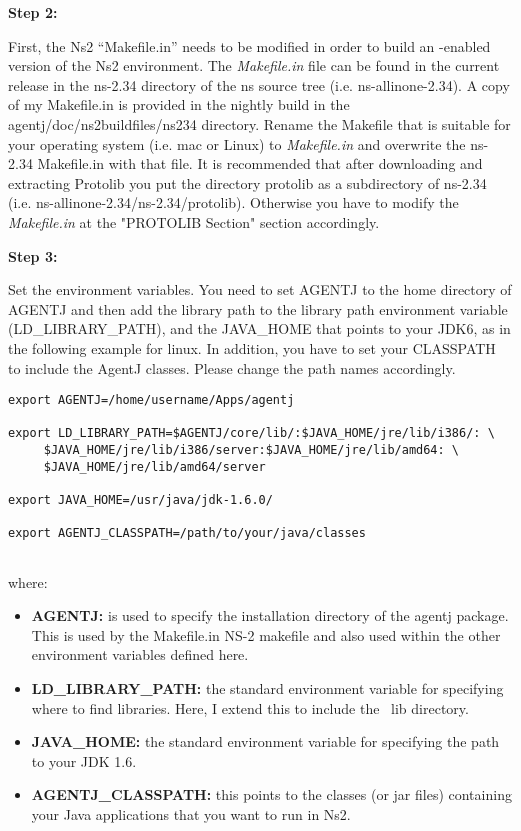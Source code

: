 

\vspace{0.1in}

\noindent \textbf{Step 2:}

First, the Ns2 ``Makefile.in'' needs to be modified in order to 
build an \agentj-enabled version of the Ns2 environment. The 
\emph{Makefile.in} file can be found in the current release in the 
ns-2.34 directory of the ns source tree (i.e. ns-allinone-2.34). A copy of my Makefile.in is
provided in the nightly build in the agentj/doc/ns2buildfiles/ns234 directory. Rename the
Makefile that is suitable for your operating system (i.e. mac or Linux) to 
\emph{Makefile.in} and overwrite the ns-2.34 Makefile.in with that file. It is recommended that after downloading and extracting Protolib you put the directory protolib as a subdirectory of ns-2.34 (i.e. ns-allinone-2.34/ns-2.34/protolib). Otherwise you have to modify the \emph{Makefile.in} at the "PROTOLIB Section" section accordingly.  



\noindent \textbf{Step 3:}

Set the environment variables. You need to set AGENTJ to the home directory of AGENTJ and then add the library path to the library path environment variable (LD\_LIBRARY\_PATH), and the JAVA\_HOME that points to your JDK6, as in the following example for linux. In addition, you have to set your CLASSPATH to include the AgentJ classes. Please change the path names accordingly.

\footnotesize
\begin{verbatim}
export AGENTJ=/home/username/Apps/agentj

export LD_LIBRARY_PATH=$AGENTJ/core/lib/:$JAVA_HOME/jre/lib/i386/: \ 
     $JAVA_HOME/jre/lib/i386/server:$JAVA_HOME/jre/lib/amd64: \ 
     $JAVA_HOME/jre/lib/amd64/server

export JAVA_HOME=/usr/java/jdk-1.6.0/

export AGENTJ_CLASSPATH=/path/to/your/java/classes
   
\end{verbatim}
\normalsize

\noindent where:
\begin{itemize}
\item \textbf{AGENTJ:} is used to specify the installation directory of the agentj
package. This is used by the Makefile.in NS-2 makefile and also used within the other environment variables defined here.

\item \textbf{LD\_LIBRARY\_PATH:} the standard environment variable for specifying where to find libraries.  Here, I extend this to include the \agentj~lib directory.

\item \textbf{JAVA\_HOME:} the standard environment variable for specifying the path to your JDK 1.6.

\item \textbf{AGENTJ\_CLASSPATH:} this points to the classes (or jar files) containing your Java applications that you want to run in Ns2.

\end{itemize}

